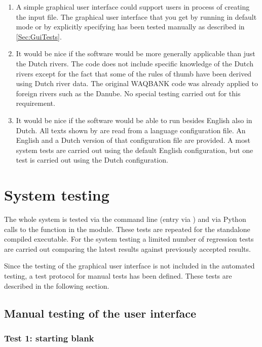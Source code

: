 \begin{enumerate}
\item A simple graphical user interface could support users in process of creating the input file.
The graphical user interface that you get by running \dfastbe in default mode or by explicitly specifying  has been tested manually as described in \autoref{Sec:GuiTests}.

\item It would be nice if the software would be more generally applicable than just the Dutch rivers.
The code does not include specific knowledge of the Dutch rivers except for the fact that some of the rules of thumb have been derived using Dutch river data.
The original WAQBANK code was already applied to foreign rivers such as the Danube.
No special testing carried out for this requirement.

\item It would be nice if the software would be able to run besides English also in Dutch.
All texts shown by \dfastbe are read from a language configuration file.
An English and a Dutch version of that configuration file are provided.
A most system tests are carried out using the default English configuration, but one test is carried out using the Dutch configuration.
\end{enumerate}

\section{System testing}

The whole system is tested via the command line (entry via ) and via Python calls to the  function in the  module.
These tests are repeated for the standalone compiled \dfastbe executable.
For the system testing a limited number of regression tests are carried out comparing the latest results against previously accepted results.

Since the testing of the graphical user interface is not included in the automated testing, a test protocol for manual tests has been defined.
These tests are described in the following section.

\subsection{Manual testing of the user interface} \label{Sec:GuiTests}

\subsubsection{Test 1: starting blank}
